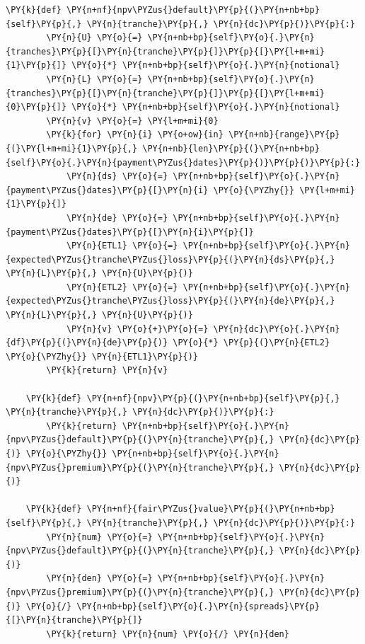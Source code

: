 \begin{tcolorbox}[breakable, size=fbox, boxrule=1pt, pad at break*=1mm,colback=cellbackground, colframe=cellborder]
\begin{Verbatim}[commandchars=\\\{\}]
    \PY{k}{def} \PY{n+nf}{npv\PYZus{}default}\PY{p}{(}\PY{n+nb+bp}{self}\PY{p}{,} \PY{n}{tranche}\PY{p}{,} \PY{n}{dc}\PY{p}{)}\PY{p}{:}
        \PY{n}{U} \PY{o}{=} \PY{n+nb+bp}{self}\PY{o}{.}\PY{n}{tranches}\PY{p}{[}\PY{n}{tranche}\PY{p}{]}\PY{p}{[}\PY{l+m+mi}{1}\PY{p}{]} \PY{o}{*} \PY{n+nb+bp}{self}\PY{o}{.}\PY{n}{notional}
        \PY{n}{L} \PY{o}{=} \PY{n+nb+bp}{self}\PY{o}{.}\PY{n}{tranches}\PY{p}{[}\PY{n}{tranche}\PY{p}{]}\PY{p}{[}\PY{l+m+mi}{0}\PY{p}{]} \PY{o}{*} \PY{n+nb+bp}{self}\PY{o}{.}\PY{n}{notional}
        \PY{n}{v} \PY{o}{=} \PY{l+m+mi}{0}
        \PY{k}{for} \PY{n}{i} \PY{o+ow}{in} \PY{n+nb}{range}\PY{p}{(}\PY{l+m+mi}{1}\PY{p}{,} \PY{n+nb}{len}\PY{p}{(}\PY{n+nb+bp}{self}\PY{o}{.}\PY{n}{payment\PYZus{}dates}\PY{p}{)}\PY{p}{)}\PY{p}{:}
            \PY{n}{ds} \PY{o}{=} \PY{n+nb+bp}{self}\PY{o}{.}\PY{n}{payment\PYZus{}dates}\PY{p}{[}\PY{n}{i} \PY{o}{\PYZhy{}} \PY{l+m+mi}{1}\PY{p}{]} 
            \PY{n}{de} \PY{o}{=} \PY{n+nb+bp}{self}\PY{o}{.}\PY{n}{payment\PYZus{}dates}\PY{p}{[}\PY{n}{i}\PY{p}{]}
            \PY{n}{ETL1} \PY{o}{=} \PY{n+nb+bp}{self}\PY{o}{.}\PY{n}{expected\PYZus{}tranche\PYZus{}loss}\PY{p}{(}\PY{n}{ds}\PY{p}{,} \PY{n}{L}\PY{p}{,} \PY{n}{U}\PY{p}{)}
            \PY{n}{ETL2} \PY{o}{=} \PY{n+nb+bp}{self}\PY{o}{.}\PY{n}{expected\PYZus{}tranche\PYZus{}loss}\PY{p}{(}\PY{n}{de}\PY{p}{,} \PY{n}{L}\PY{p}{,} \PY{n}{U}\PY{p}{)}
            \PY{n}{v} \PY{o}{+}\PY{o}{=} \PY{n}{dc}\PY{o}{.}\PY{n}{df}\PY{p}{(}\PY{n}{de}\PY{p}{)} \PY{o}{*} \PY{p}{(}\PY{n}{ETL2} \PY{o}{\PYZhy{}} \PY{n}{ETL1}\PY{p}{)}
        \PY{k}{return} \PY{n}{v}
	
    \PY{k}{def} \PY{n+nf}{npv}\PY{p}{(}\PY{n+nb+bp}{self}\PY{p}{,} \PY{n}{tranche}\PY{p}{,} \PY{n}{dc}\PY{p}{)}\PY{p}{:}
        \PY{k}{return} \PY{n+nb+bp}{self}\PY{o}{.}\PY{n}{npv\PYZus{}default}\PY{p}{(}\PY{n}{tranche}\PY{p}{,} \PY{n}{dc}\PY{p}{)} \PY{o}{\PYZhy{}} \PY{n+nb+bp}{self}\PY{o}{.}\PY{n}{npv\PYZus{}premium}\PY{p}{(}\PY{n}{tranche}\PY{p}{,} \PY{n}{dc}\PY{p}{)}
	
    \PY{k}{def} \PY{n+nf}{fair\PYZus{}value}\PY{p}{(}\PY{n+nb+bp}{self}\PY{p}{,} \PY{n}{tranche}\PY{p}{,} \PY{n}{dc}\PY{p}{)}\PY{p}{:}
        \PY{n}{num} \PY{o}{=} \PY{n+nb+bp}{self}\PY{o}{.}\PY{n}{npv\PYZus{}default}\PY{p}{(}\PY{n}{tranche}\PY{p}{,} \PY{n}{dc}\PY{p}{)}
        \PY{n}{den} \PY{o}{=} \PY{n+nb+bp}{self}\PY{o}{.}\PY{n}{npv\PYZus{}premium}\PY{p}{(}\PY{n}{tranche}\PY{p}{,} \PY{n}{dc}\PY{p}{)} \PY{o}{/} \PY{n+nb+bp}{self}\PY{o}{.}\PY{n}{spreads}\PY{p}{[}\PY{n}{tranche}\PY{p}{]}
        \PY{k}{return} \PY{n}{num} \PY{o}{/} \PY{n}{den}
\end{Verbatim}
\end{tcolorbox}

